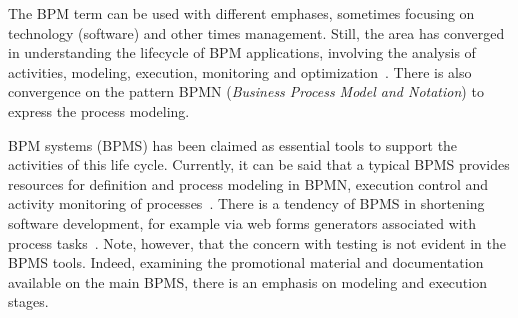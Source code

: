 \documentclass[runningheads,a4paper]{llncs}
\begin{document}
{%

The BPM term can be used with different emphases, sometimes focusing on technology (software) and other times management. Still, the area has converged in understanding the lifecycle of BPM applications, involving the analysis of activities, modeling, execution, monitoring and optimization~\cite{ABPMP}. There is also convergence on the pattern BPMN (\emph{Business Process Model and Notation}) to express the process modeling. 


BPM systems (BPMS) has been claimed as essential tools to support the activities of this life cycle. Currently, it can be said that a typical BPMS provides resources for definition and process modeling in BPMN, execution control and activity monitoring of processes~\cite{forrester}. There is a tendency of BPMS in shortening software development, for example via web forms generators associated with process tasks~\cite{greenresearch}. Note, however, that the concern with testing is not evident in the BPMS tools. Indeed, examining the promotional material and documentation available on the main BPMS, there is an emphasis on modeling and execution stages.


}
\end{document}

